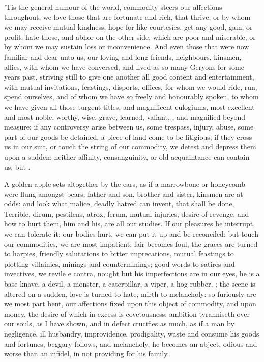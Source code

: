 {'Tis the general humour of the world, commodity steers our affections
throughout, we love those that are fortunate and rich, that thrive, or
by whom we may receive mutual kindness, hope for like courtesies, get
any good, gain, or profit; hate those, and abhor on the other side,
which are poor and miserable, or by whom we may sustain loss or
inconvenience. And even those that were now familiar and dear unto us,
our loving and long friends, neighbours, kinsmen, allies, with whom we
have conversed, and lived as so many Geryons for some years past,
striving still to give one another all good content and entertainment,
with mutual invitations, feastings, disports, offices, for whom we
would ride, run, spend ourselves, and of whom we have so freely and
honourably spoken, to whom we have given all those turgent titles, and
magnificent eulogiums, most excellent and most noble, worthy, wise,
grave, learned, valiant, \etc{}, and magnified beyond measure: if any
controversy arise between us, some trespass, injury, abuse, some part
of our goods be detained, a piece of land come to be litigious, if they
cross us in our suit, or touch the string of our commodity, we detest
and depress them upon a sudden: neither affinity, consanguinity, or old
acquaintance can contain us, but .

A golden apple sets altogether by the ears, as if a marrowbone or
honeycomb were flung amongst bears: father and son, brother and sister,
kinsmen are at odds: and look what malice, deadly hatred can invent,
that shall be done, Terrible, dirum, pestilens, atrox, ferum, mutual
injuries, desire of revenge, and how to hurt them, him and his, are all
our studies. If our pleasures be interrupt, we can tolerate it: our
bodies hurt, we can put it up and be reconciled: but touch our
commodities, we are most impatient: fair becomes foul, the graces are
turned to harpies, friendly salutations to bitter imprecations, mutual
feastings to plotting villainies, minings and counterminings; good
words to satires and invectives, we revile e contra, nought but his
imperfections are in our eyes, he is a base knave, a devil, a monster,
a caterpillar, a viper, a hog-rubber, \etc{} ; the scene is altered on a sudden, love is turned
to hate, mirth to melancholy: so furiously are we most part bent, our
affections fixed upon this object of commodity, and upon money, the
desire of which in excess is covetousness: ambition tyranniseth over
our souls, as I have shown, and in defect crucifies as much, as
if a man by negligence, ill husbandry, improvidence, prodigality, waste
and consume his goods and fortunes, beggary follows, and melancholy, he
becomes an abject, odious and worse than an infidel, in not
providing for his family.

}
